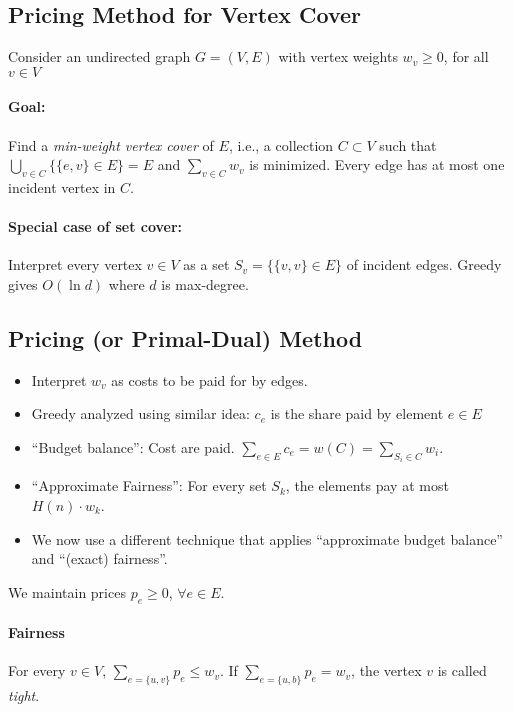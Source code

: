\subsection{Pricing Method for Vertex Cover}

Consider an undirected graph $G = (V,E)$ with vertex weights $w_v \ge 0$, for all $v \in V$

\paragraph{Goal:} Find a \emph{min-weight vertex cover} of $E$, i.e., a collection $C \subset V$ such that $\bigcup\limits_{v \in C} \{\{e,v\} \in E\} = E$ and $\sum\limits_{v \in C} w_v$ is minimized. Every edge has at most one incident vertex in $C$.

\paragraph{Special case of set cover:} Interpret every vertex $v \in V$ as a set $S_v = \{ \{v,v\} \in E\}$ of incident edges. Greedy gives $O(\ln d)$ where $d$ is max-degree.

\subsection{Pricing (or Primal-Dual) Method}

\begin{itemize}
\item Interpret $w_v$ as costs to be paid for by edges.
\item Greedy analyzed using similar idea: $c_e$ is the share paid by element $e \in E$
\item ``Budget balance'': Cost are paid. $\sum\limits_{e \in E} c_e = w(C) = \sum\limits_{S_i \in C} w_i$.
\item ``Approximate Fairness'': For every set $S_k$, the elements pay at most $H(n) \cdot w_k$.
\item We now use a different technique that applies ``approximate budget balance'' and ``(exact) fairness''.
\end{itemize}

We maintain prices $p_e \ge 0$, $\forall e \in E$.

\paragraph{Fairness} For every $v \in V$, $\sum\limits_{e = \{u,v\}} p_e \le w_v$. If $\sum\limits_{e = \{u,b\}} p_e = w_v$, the vertex $v$ is called \emph{tight}.

